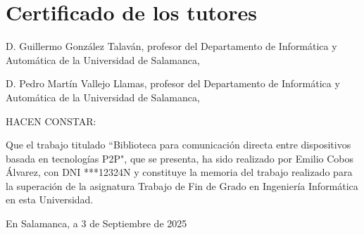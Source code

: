 \thispagestyle{certificate}

\vspace*{4em}

\section*{Certificado de los tutores}

\vspace{2em}

D. Guillermo González Talaván, profesor del Departamento de Informática y
Automática de la Universidad de Salamanca,

D. Pedro Martín Vallejo Llamas, profesor del Departamento de Informática y
Automática de la Universidad de Salamanca,

\vspace{2em}

\noindent HACEN CONSTAR:

\vspace{2em}

Que el trabajo titulado ``Biblioteca para comunicación directa entre
dispositivos basada en tecnologías P2P", que se presenta, ha sido realizado por
Emilio Cobos Álvarez, con DNI ***12324N y constituye la memoria del trabajo
realizado para la superación de la asignatura Trabajo de Fin de Grado en
Ingeniería Informática en esta Universidad.

\vspace{2em}

\begin{center}
En Salamanca, a 3 de Septiembre de 2025
\end{center}
